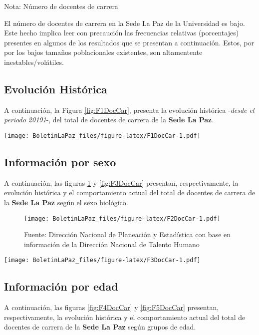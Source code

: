 \documentclass[
]{book}
\begin{document}
Nota: Número de docentes de carrera

El número de docentes de carrera en la Sede La Paz de la Universidad es bajo. Este hecho implica leer con precaución las frecuencias relativas (porcentajes) presentes en algunos de los resultados que se presentan a continuación. Estos, por por los bajos tamaños poblacionales existentes, son altamentente inestables/volátiles.

\hypertarget{evoluciuxf3n-histuxf3rica-2}{%
\subsection{Evolución Histórica}\label{evoluciuxf3n-histuxf3rica-2}}

A continuación, la Figura \ref{fig:F1DocCar}, presenta la evolución histórica -\emph{desde el periodo 20191}-, del total de docentes de carrera de la \textbf{Sede La Paz}.

\texttt{[image: BoletinLaPaz\_files/figure-latex/F1DocCar-1.pdf]}

\hypertarget{informaciuxf3n-por-sexo-2}{%
\subsection{Información por sexo}\label{informaciuxf3n-por-sexo-2}}

A continuación, las figuras \ref{fig:F2DocCar} y \ref{fig:F3DocCar} presentan, respectivamente, la evolución histórica y el comportamiento actual del total de docentes de carrera de la \textbf{Sede La Paz} según el sexo biológico.

\begin{figure}
\centering
\texttt{[image: BoletinLaPaz\_files/figure-latex/F2DocCar-1.pdf]}
\caption{\label{fig:F2DocCar}Fuente: Dirección Nacional de Planeación y Estadística con base en información de la Dirección Nacional de Talento Humano}
\end{figure}

\texttt{[image: BoletinLaPaz\_files/figure-latex/F3DocCar-1.pdf]}

\hypertarget{informaciuxf3n-por-edad-2}{%
\subsection{Información por edad}\label{informaciuxf3n-por-edad-2}}

A continuación, las figuras \ref{fig:F4DocCar} y \ref{fig:F5DocCar} presentan, respectivamente, la evolución histórica y el comportamiento actual del total de docentes de carrera de la \textbf{Sede La Paz} según grupos de edad.
\end{document}
